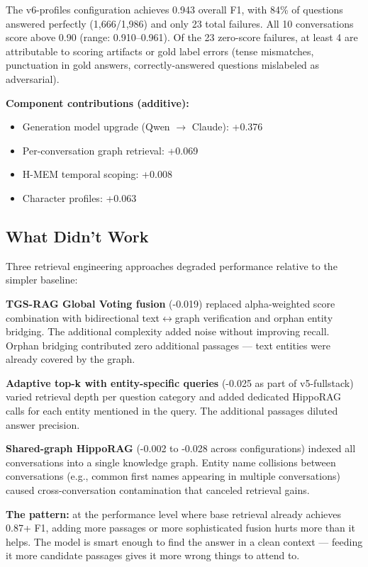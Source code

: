\documentclass[11pt]{article}
\begin{document}
The v6-profiles configuration achieves 0.943 overall F1, with 84\% of questions answered perfectly (1,666/1,986) and only 23 total failures. All 10 conversations score above 0.90 (range: 0.910--0.961). Of the 23 zero-score failures, at least 4 are attributable to scoring artifacts or gold label errors (tense mismatches, punctuation in gold answers, correctly-answered questions mislabeled as adversarial).

\textbf{Component contributions (additive):}

\begin{itemize}
  \item Generation model upgrade (Qwen $\rightarrow$ Claude): +0.376
  \item Per-conversation graph retrieval: +0.069
  \item H-MEM temporal scoping: +0.008
  \item Character profiles: +0.063
\end{itemize}


\subsection{What Didn't Work}

Three retrieval engineering approaches degraded performance relative to the simpler baseline:

\textbf{TGS-RAG Global Voting fusion} (-0.019) replaced alpha-weighted score combination with bidirectional text$\leftrightarrow$graph verification and orphan entity bridging. The additional complexity added noise without improving recall. Orphan bridging contributed zero additional passages --- text entities were already covered by the graph.

\textbf{Adaptive top-k with entity-specific queries} (-0.025 as part of v5-fullstack) varied retrieval depth per question category and added dedicated HippoRAG calls for each entity mentioned in the query. The additional passages diluted answer precision.

\textbf{Shared-graph HippoRAG} (-0.002 to -0.028 across configurations) indexed all conversations into a single knowledge graph. Entity name collisions between conversations (e.g., common first names appearing in multiple conversations) caused cross-conversation contamination that canceled retrieval gains.

\textbf{The pattern:} at the performance level where base retrieval already achieves 0.87+ F1, adding more passages or more sophisticated fusion hurts more than it helps. The model is smart enough to find the answer in a clean context --- feeding it more candidate passages gives it more wrong things to attend to.
\end{document}
